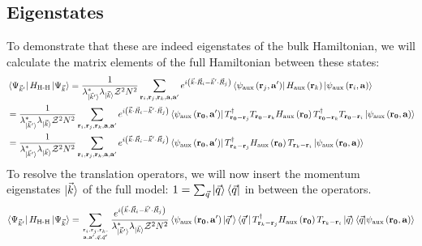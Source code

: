 \documentclass[reprint,hidelinks]{revtex4-2}
\begin{document}
\begin{widetext}
\subsection{Eigenstates}
To demonstrate that these are indeed eigenstates of the bulk Hamiltonian, we will calculate the matrix elements of the full Hamiltonian between these states:
\begin{equation}\begin{aligned}
	&\bra{\Psi_{\vec k^\prime}}H_\text{H-H} \ket{\Psi_{\vec k}} = \frac{1}{\lambda^*_{\ket{\vec k^\prime}} \lambda_{\ket{\vec k}} \mathcal{Z}^2 N^2}\sum_{{\bf r}_i, {\bf r}_j, {\bf r}_k, {\bf a}, {\bf a}^\prime}e^{i\left(\vec{k}\cdot\vec{R}_i - \vec{k}^\prime\cdot\vec{R}_j\right)} \bra{\psi_\text{aux}\left({\bf r}_j, {\bf a}^\prime\right)} H_\text{aux}\left({\bf r}_k\right) \ket{\psi_\text{aux}\left({\bf r}_i, {\bf a}\right)}\\
	&= \frac{1}{\lambda^*_{\ket{\vec k^\prime}} \lambda_{\ket{\vec k}} \mathcal{Z}^2 N^2}\sum_{{\bf r}_i, {\bf r}_j, {\bf r}_k, {\bf a}, {\bf a}^\prime}e^{i\left(\vec{k}\cdot\vec{R}_i - \vec{k}^\prime\cdot\vec{R}_j\right)} \bra{\psi_\text{aux}\left({\bf r_0}, {\bf a}^\prime\right)} T^\dagger_{{\bf r_0} - {\bf r}_j} T_{{\bf r_0} - {\bf r}_k} H_\text{aux}\left({\bf r_0}\right) T^\dagger_{{\bf r_0} - {\bf r}_k} T_{{\bf r_0} - {\bf r}_i} \ket{\psi_\text{aux}\left({\bf r_0}, {\bf a}\right)}\\
	&= \frac{1}{\lambda^*_{\ket{\vec k^\prime}} \lambda_{\ket{\vec k}} \mathcal{Z}^2 N^2}\sum_{{\bf r}_i, {\bf r}_j, {\bf r}_k, {\bf a}, {\bf a}^\prime}e^{i\left(\vec{k}\cdot\vec{R}_i - \vec{k}^\prime\cdot\vec{R}_j\right)} \bra{\psi_\text{aux}\left({\bf r_0}, {\bf a}^\prime\right)} T^\dagger_{{\bf r}_k - {\bf r}_j} H_\text{aux}\left({\bf r_0}\right) T_{{\bf r}_k - {\bf r}_i} \ket{\psi_\text{aux}\left({\bf r_0}, {\bf a}\right)}
\end{aligned}\end{equation}
To resolve the translation operators, we will now insert the momentum eigenstates \(\ket{\vec k}\) of the full model: \(1 = \sum_{\vec q}\ket{\vec q}\bra{\vec q}\) in between the operators.
\begin{equation}\begin{aligned}
	\bra{\Psi_{\vec k^\prime}}H_\text{H-H} \ket{\Psi_{\vec k}} &= \sum_{{\bf r}_i, {\bf r}_j, {\bf r}_k, \atop{{\bf a}, {\bf a}^\prime, \vec q, \vec q^\prime}}\frac{e^{i\left(\vec{k}\cdot\vec{R}_i - \vec{k}^\prime\cdot\vec{R}_j\right)}}{\lambda^*_{\ket{\vec k^\prime}} \lambda_{\ket{\vec k}} \mathcal{Z}^2 N^2} \braket{\psi_\text{aux}\left({\bf r_0}, {\bf a}^\prime\right)| \vec q^\prime}\bra{\vec q^\prime} T^\dagger_{{\bf r}_k - {\bf r}_j} H_\text{aux}\left({\bf r_0}\right) T_{{\bf r}_k - {\bf r}_i}  \ket{\vec q}\braket{\vec q | \psi_\text{aux}\left({\bf r_0}, {\bf a}\right)}\\

\end{aligned}
\end{equation}
\end{widetext}
\end{document}
